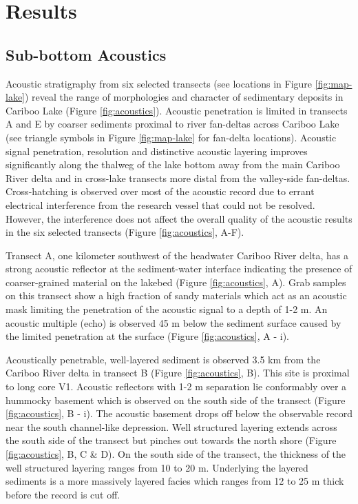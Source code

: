 \documentclass[Royal,times,doublespace,sageh]{sagej}
\begin{document}
\hypertarget{results}{%
\section{Results}\label{results}}

\hypertarget{sub-bottom-acoustics}{%
\subsection{Sub-bottom Acoustics}\label{sub-bottom-acoustics}}

Acoustic stratigraphy from six selected transects (see locations in
Figure \ref{fig:map-lake}) reveal the range of morphologies and
character of sedimentary deposits in Cariboo Lake (Figure
\ref{fig:acoustics}). Acoustic penetration is limited in transects A and
E by coarser sediments proximal to river fan-deltas across Cariboo Lake
(see triangle symbols in Figure \ref{fig:map-lake} for fan-delta
locations). Acoustic signal penetration, resolution and distinctive
acoustic layering improves significantly along the thalweg of the lake
bottom away from the main Cariboo River delta and in cross-lake
transects more distal from the valley-side fan-deltas. Cross-hatching is
observed over most of the acoustic record due to errant electrical
interference from the research vessel that could not be resolved.
However, the interference does not affect the overall quality of the
acoustic results in the six selected transects (Figure
\ref{fig:acoustics}, A-F).

Transect A, one kilometer southwest of the headwater Cariboo River
delta, has a strong acoustic reflector at the sediment-water interface
indicating the presence of coarser-grained material on the lakebed
(Figure \ref{fig:acoustics}, A). Grab samples on this transect show a
high fraction of sandy materials which act as an acoustic mask limiting
the penetration of the acoustic signal to a depth of 1-2 m. An acoustic
multiple (echo) is observed 45 m below the sediment surface caused by
the limited penetration at the surface (Figure \ref{fig:acoustics}, A -
i).

Acoustically penetrable, well-layered sediment is observed 3.5 km from
the Cariboo River delta in transect B (Figure \ref{fig:acoustics}, B).
This site is proximal to long core V1. Acoustic reflectors with 1-2 m
separation lie conformably over a hummocky basement which is observed on
the south side of the transect (Figure \ref{fig:acoustics}, B - i). The
acoustic basement drops off below the observable record near the south
channel-like depression. Well structured layering extends across the
south side of the transect but pinches out towards the north shore
(Figure \ref{fig:acoustics}, B, C \& D). On the south side of the
transect, the thickness of the well structured layering ranges from 10
to 20 m. Underlying the layered sediments is a more massively layered
facies which ranges from 12 to 25 m thick before the record is cut off.
\end{document}
